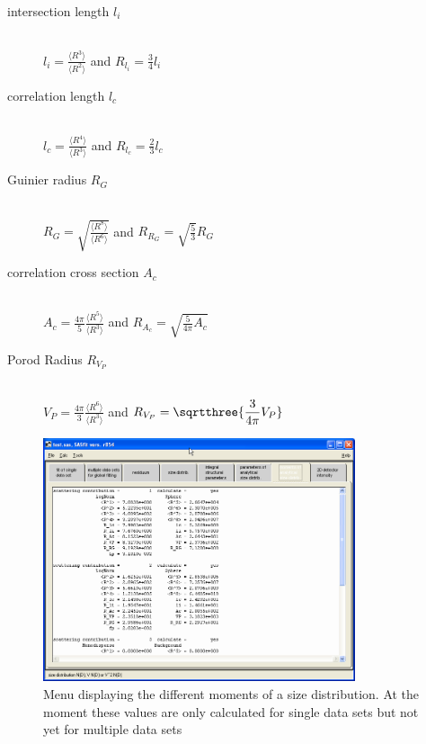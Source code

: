 ~\\
\begin{description}
\item[intersection length $l_i$]~\\
$\displaystyle l_i = \frac{\langle R^3\rangle}{\langle R^2\rangle}
$ and  $\displaystyle R_{l_i} = \frac{3}{4} l_i $

\item[correlation length $l_c$]~\\
$\displaystyle l_c = \frac{\langle R^4\rangle}{\langle R^3\rangle}
$ and  $\displaystyle R_{l_c} = \frac{2}{3} l_c $

\item[Guinier radius $R_G$]~\\
$\displaystyle R_G = \sqrt{\frac{\langle R^8\rangle}{\langle
R^6\rangle}} $ and  $\displaystyle R_{R_G} = \sqrt{\frac{5}{3}}
R_G $

\item[correlation cross section $A_c$]~\\
$\displaystyle A_c = \frac{4\pi}{5}\frac{\langle
R^5\rangle}{\langle R^3\rangle} $ and  $\displaystyle R_{A_c} =
\sqrt{\frac{5}{4\pi} A_c} $

\item[Porod Radius $R_{V_P}$]~\\
$\displaystyle V_P = \frac{4\pi}{3}\frac{\langle
R^6\rangle}{\langle R^3\rangle} $ and  $\displaystyle R_{V_P} =
\sqrtthree{\frac{3}{4\pi} V_P} $
\end{description}


\begin{figure}[htb]
\begin{center}
\includegraphics[width=0.818\textwidth]{QTmoments.png}
\end{center}
\caption{Menu displaying the different moments of a size
distribution. At the moment these values are only calculated for
single data sets but not yet for multiple data sets}
\label{fig:QTmoments}
\end{figure}

